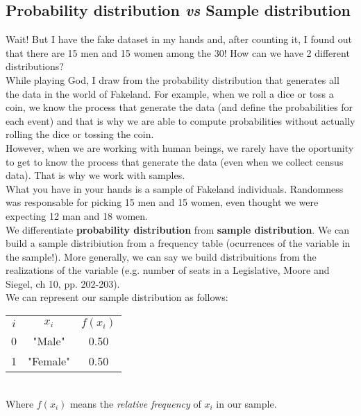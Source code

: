\documentclass[11pt]{article}
\begin{document}
	\subsection*{Probability distribution \emph{vs} Sample distribution}

	Wait! But I have the fake dataset in my hands and, after counting it, I found out that there are 15 men and 15 women among the 30! How can we have 2 different distributions?\\

	While playing God, I draw from the probability distribution that generates all the data in the world of Fakeland. For example, when we roll a dice or toss a coin, we know the process that generate the data (and define the probabilities for each event) and that is why we are able to compute probabilities without actually rolling the dice or tossing the coin.\\
	
	However, when we are working with human beings, we rarely have the oportunity to get to know the process that generate the data (even when we collect census data). That is why we work with samples.\\
	
	What you have in your hands is a sample of Fakeland individuals. Randomness was responsable for picking 15 men and 15 women, even thought we were expecting 12 man and 18 women.\\

	We differentiate \textbf{probability distribution} from \textbf{sample distribution}. We can build a sample distribiution from a frequency table (ocurrences of the variable in the sample!). More generally, we can say we build distribuitions from the realizations of the variable (e.g. number of seats in a Legislative, Moore and Siegel, ch 10, pp. 202-203).\\
	
	We can represent our sample distribution as follows:\\
	
\begin{tabular}{|c|c|c|}
\hline
	$i$ & $x_i$ & $f(x_i)$\\
	\cline{1-3}
	0 & "Male" & 0.50\\
	1 & "Female" & 0.50\\
\hline
\end{tabular}\\
	
	Where $f(x_i)$ means the \emph{relative frequency} of $x_i$ in our sample.\\
\end{document}
